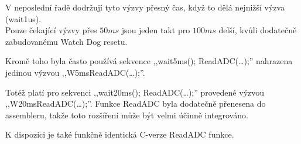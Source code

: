 V neposlední řadě dodržují tyto výzvy přesný čas, když to dělá nejnižší výzva (wait1us).
\\Pouze čekající výzvy přes \(50ms\) jsou jeden takt pro \(100ms\) delší, kvůli dodatečně zabudovanému
Watch Dog resetu.


Kromě toho byla často používá sekvence ,,wait5ms(); ReadADC(\dots);'' nahrazena jedinou výzvou ,,W5msReadADC(\dots);''.

Totéž platí pro sekvenci ,,wait20ms(); ReadADC(\dots);'' provedené výzvou
,,W20msReadADC(\dots);''.
Funkce ReadADC byla dodatečně přenesena do assembleru, takže toto rozšíření
může být velmi účinně integrováno.

K dispozici je také funkčně identická C-verze ReadADC funkce.